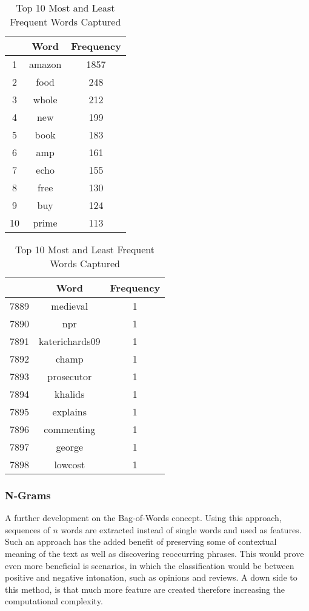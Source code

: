 		\begin{table}[H]
			\centering
			\begin{tabular}{ccc}
				\hline\hline
				&	Word 	& Frequency \\
				\hline
				1	&	amazon 	& 1857	\\
				2	&	food	& 248	\\	
				3	&	whole 	& 212	\\
				4	&	new		& 199	\\
				5	&	book	& 183	\\
				6	&	amp		& 161	\\
				7	&	echo 	& 155	\\
				8	&	free 	& 130	\\
				9	&	buy 	& 124	\\
				10	&	prime 	& 113	\\
				\hline\hline				
			\end{tabular}
			\qquad 
			\begin{tabular}{ccc}
				\hline\hline
				&	Word 	& Frequency \\
				\hline
				7889	&	medieval 		& 1	\\
				7890	&	npr				& 1	\\	
				7891	&	katerichards09 	& 1	\\
				7892	&	champ			& 1	\\
				7893	&	prosecutor		& 1	\\
				7894	&	khalids			& 1	\\
				7895	&	explains 		& 1	\\
				7896	&	commenting 		& 1	\\
				7897	&	george 			& 1	\\
				7898	&	lowcost 		& 1	\\
				\hline\hline				
			\end{tabular}
			\caption{Top 10 Most and Least Frequent Words Captured}
			\label{table:BOW_top_words}%
		\end{table}%
	
	\subsubsection{N-Grams}
		A further development on the Bag-of-Words concept. Using this approach, sequences of $ n $ words are extracted instead of single words and used as features. Such an approach has the added benefit of preserving some of contextual meaning of the text as well as discovering reoccurring phrases. This would prove even more beneficial is scenarios, in which the classification would be between positive and negative intonation, such as opinions and reviews. A down side to this method, is that much more feature are created therefore increasing the computational complexity. 
	
